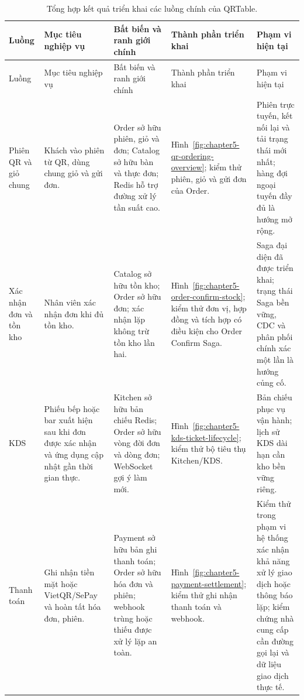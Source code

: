 {\scriptsize\sloppy
\setlength{\tabcolsep}{2pt}
\begin{longtable}{>{\raggedright\arraybackslash}p{}>{\raggedright\arraybackslash}p{}>{\raggedright\arraybackslash}p{}>{\raggedright\arraybackslash}p{}>{\raggedright\arraybackslash}p{}}
  \caption{Tổng hợp kết quả triển khai các luồng chính của QRTable.}
  \label{tab:chapter5-implemented-evidence}\\
  \toprule
  Luồng & Mục tiêu nghiệp vụ & Bất biến và ranh giới chính & Thành phần triển khai & Phạm vi hiện tại \\
  \midrule
  \endfirsthead
  \toprule
  Luồng & Mục tiêu nghiệp vụ & Bất biến và ranh giới chính & Thành phần triển khai & Phạm vi hiện tại \\
  \midrule
  \endhead
  \bottomrule
  \endfoot
  Phiên QR và giỏ chung & Khách vào phiên từ QR, dùng chung giỏ và gửi đơn. & Order sở hữu phiên, giỏ và đơn; Catalog sở hữu bàn và thực đơn; Redis hỗ trợ đường xử lý tần suất cao. & Hình~\ref{fig:chapter5-qr-ordering-overview}; kiểm thử phiên, giỏ và gửi đơn của Order. & Phiên trực tuyến, kết nối lại và tải trạng thái mới nhất; hàng đợi ngoại tuyến đầy đủ là hướng mở rộng. \\
  Xác nhận đơn và tồn kho & Nhân viên xác nhận đơn khi đủ tồn kho. & Catalog sở hữu tồn kho; Order sở hữu đơn; xác nhận lặp không trừ tồn kho lần hai. & Hình~\ref{fig:chapter5-order-confirm-stock}; kiểm thử đơn vị, hợp đồng và tích hợp có điều kiện cho Order Confirm Saga. & Saga đại diện đã được triển khai; trạng thái Saga bền vững, CDC và phân phối chính xác một lần là hướng củng cố. \\
  KDS & Phiếu bếp hoặc bar xuất hiện sau khi đơn được xác nhận và ứng dụng cập nhật gần thời gian thực. & Kitchen sở hữu bản chiếu Redis; Order sở hữu vòng đời đơn và dòng đơn; WebSocket gợi ý làm mới. & Hình~\ref{fig:chapter5-kds-ticket-lifecycle}; kiểm thử bộ tiêu thụ Kitchen/KDS. & Bản chiếu phục vụ vận hành; lịch sử KDS dài hạn cần kho bền vững riêng. \\
  Thanh toán & Ghi nhận tiền mặt hoặc VietQR/SePay và hoàn tất hóa đơn, phiên. & Payment sở hữu bản ghi thanh toán; Order sở hữu hóa đơn và phiên; webhook trùng hoặc thiếu được xử lý lặp an toàn. & Hình~\ref{fig:chapter5-payment-settlement}; kiểm thử ghi nhận thanh toán và webhook. & Kiểm thử trong phạm vi hệ thống xác nhận khả năng xử lý giao dịch hoặc thông báo lặp; kiểm chứng nhà cung cấp cần đường gọi lại và dữ liệu giao dịch thực tế. \\

\end{longtable}}
